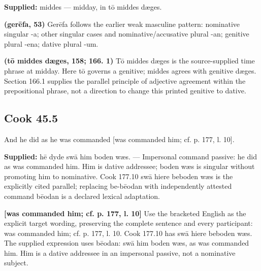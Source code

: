 \textbf{Supplied:} middes — midday, in tō middes dæges.

\textbf{(gerēfa, 53)} Gerēfa follows the earlier weak masculine pattern: nominative singular -a; other singular cases and nominative/\allowbreak{}accusative plural -an; genitive plural -ena; dative plural -um.

\textbf{(tō middes dæges, 158; 166. 1)} Tō middes dæges is the source-supplied time phrase at midday. Here tō governs a genitive; middes agrees with genitive dæges. Section 166.1 supplies the parallel principle of adjective agreement within the prepositional phrase, not a direction to change this printed genitive to dative.

\par\begin{minipage}{\linewidth}\raggedright
\subsection*{Cook 45.5}

And he did as he was commanded [was commanded him; cf. p. 177, l. 10].

\end{minipage}\par\addvspace{4pt}

\textbf{Supplied:} hē dyde swā him boden wæs. — Impersonal command passive: he did as was commanded him. Him is dative addressee; boden wæs is singular without promoting him to nominative. Cook 177.10 swā hiere beboden wæs is the explicitly cited parallel; replacing be-bēodan with independently attested command bēodan is a declared lexical adaptation.

\textbf{[was commanded him; cf. p. 177, l. 10]} Use the bracketed English as the explicit target wording, preserving the complete sentence and every participant: was commanded him; cf. p. 177, l. 10. Cook 177.10 has swā hiere beboden wæs. The supplied expression uses bēodan: swā him boden wæs, as was commanded him. Him is a dative addressee in an impersonal passive, not a nominative subject.

